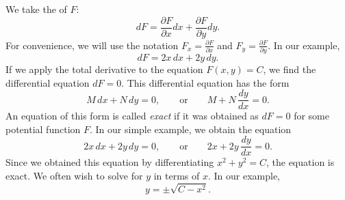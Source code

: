 We take the
\emph{} of
$F$:
\begin{equation*}
dF = \frac{\partial F}{\partial x} dx + \frac{\partial F}{\partial y} dy .
\end{equation*}
For convenience,
we will use the notation
$F_x = \frac{\partial F}{\partial x}$ and
$F_y = \frac{\partial F}{\partial y}$.
In our example,
\begin{equation*}
dF = 2x \, dx + 2y \, dy .
\end{equation*}
If we apply the total derivative to the equation $F(x,y) = C$, we find
the differential equation $dF = 0$.  This differential equation
has the form
\begin{equation*}
M \, dx + N \, dy = 0, \qquad
\text{or} \qquad
M + N \, \frac{dy}{dx} = 0 .
\end{equation*}
An equation of this form
is called \emph{exact} if it was obtained as $dF = 0$ for some potential
function $F$.
In our simple example, we obtain the equation
\begin{equation*}
2x \, dx + 2y \, dy = 0, \qquad
\text{or} \qquad
2x + 2y \, \frac{dy}{dx} = 0 .
\end{equation*}
Since we obtained this equation by differentiating $x^2+y^2=C$, 
the equation is exact.
We often wish to solve for $y$ in terms of $x$.  In our example,
\begin{equation*}
y = \pm \sqrt{C-x^2} .
\end{equation*}

